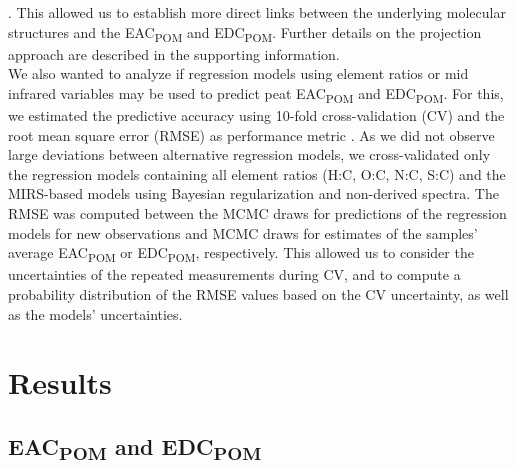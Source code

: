 \documentclass[draft,linenumbers]{agujournal2018}
\begin{document}
\citep{Piironen.2020}. This allowed us to establish more direct links
between the underlying molecular structures and the
EAC\textsubscript{POM} and EDC\textsubscript{POM}. Further details on
the projection approach are described in the supporting information.\\
We also wanted to analyze if regression models using element ratios or
mid infrared variables may be used to predict peat
EAC\textsubscript{POM} and EDC\textsubscript{POM}. For this, we
estimated the predictive accuracy using 10-fold cross-validation (CV)
\citep{Roberts.2017} and the root mean square error (RMSE) as
performance metric \citep{Bellocchi.2010}. As we did not observe large
deviations between alternative regression models, we cross-validated
only the regression models containing all element ratios (H:C, O:C, N:C,
S:C) and the MIRS-based models using Bayesian regularization and
non-derived spectra. The RMSE was computed between the MCMC draws for
predictions of the regression models for new observations and MCMC draws
for estimates of the samples' average EAC\textsubscript{POM} or
EDC\textsubscript{POM}, respectively. This allowed us to consider the
uncertainties of the repeated measurements during CV, and to compute a
probability distribution of the RMSE values based on the CV uncertainty,
as well as the models' uncertainties.

\section{Results}

\subsection{\texorpdfstring{EAC\textsubscript{POM} and
EDC\textsubscript{POM}}{EAC and EDC}}
\end{document}
